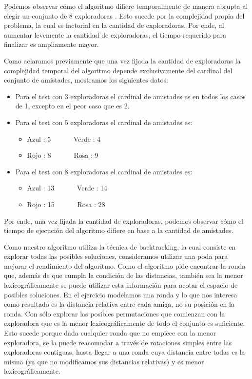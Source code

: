 \documentclass[11pt]{article}
\begin{document}
Podemos observar cómo el algoritmo difiere temporalmente de manera abrupta al elegir un conjunto de 8 exploradoras
. Esto sucede por la complejidad propia del problema, la cual es factorial en la cantidad de exploradoras.
Por ende, al aumentar levemente la cantidad de exploradoras, el tiempo requerido para finalizar es ampliamente mayor.

Como aclaramos previamente que una vez fijada la cantidad de exploradoras la complejidad temporal del algoritmo 
depende exclusivamente del cardinal del conjunto de amistades, mostramos los siguientes datos:
\begin{itemize}
  \item Para el test con 3 exploradoras el cardinal de amistades es en todos los casos de 1, excepto 
    en el peor caso que es 2.
  \item Para el test con 5 exploradoras el cardinal de amistades es:
    \begin{itemize}
      \item Azul : 5  \ \ \ \ \ \ \inlineitem Verde :  4
      \item Rojo : 8  \ \ \ \ \ \ \inlineitem Rosa  :  9
    \end{itemize}
  \item Para el test con 8 exploradoras el cardinal de amistades es:
    \begin{itemize}
      \item Azul : 13  \ \ \ \ \ \ \inlineitem Verde :  14
      \item Rojo : 15  \ \ \ \ \ \ \inlineitem Rosa  :  28
    \end{itemize}
\end{itemize}

Por ende, una vez fijada la cantidad de exploradoras, podemos observar cómo el tiempo de ejecución del algoritmo 
difiere en base a la cantidad de amistades. 

Como nuestro algoritmo utiliza la técnica de backtracking, la cual consiste en explorar todas las posibles 
soluciones, consideramos utilizar una poda para mejorar el rendimiento del algoritmo. Como el algoritmo pide 
encontrar la ronda que, además de que cumpla la condición de las distancias, también sea la menor lexicográficamente 
se puede utilizar esta información para acotar el espacio de posibles soluciones. En el ejercicio modelamos 
una ronda y lo que nos interesa como resultado es la distancia relativa entre cada amiga, no su posición en la ronda. 
Con sólo explorar las posibles permutaciones que comienzan con la exploradora que es la menor lexicográficamente 
de todo el conjunto es suficiente. Esto sucede porque dada cualquier ronda que no empiece con la menor exploradora, 
se la puede reacomodar a través de rotaciones simples entre las exploradoras contiguas, hasta llegar a una ronda 
cuya distancia entre todas es la misma (ya que no modificamos sus distancias relativas) y es menor lexicográficamente.
\end{document}
